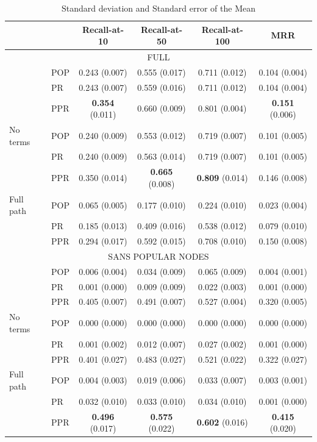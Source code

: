 \documentclass[11pt,oneside]{book}
\begin{document}
\begin{table}[p]
\centering
\caption{Standard deviation and Standard error of the Mean}
\label{tab:full}
\begin{tabular}{llcccc} \hline
	& & Recall-at-10 & Recall-at-50 & Recall-at-100 & MRR	 \\
\hline
\multicolumn{6}{c}{FULL} \\
\hline
& POP & 0.243 (0.007) & 0.555 (0.017) & 0.711 (0.012) & 0.104 (0.004) \\
& PR & 	0.243 (0.007) & 0.559 (0.016) & 0.711 (0.012) & 0.104 (0.004) \\
& PPR	& \textbf{0.354}	(0.011) & 0.660	(0.009) & 0.801 (0.004) & \textbf{0.151}	(0.006) \\
\hline
No terms & POP & 0.240 (0.009) & 0.553 (0.012) & 0.719 (0.007) & 0.101 (0.005) \\
& PR & 0.240 (0.009) & 0.563 (0.014) & 0.719 (0.007) & 0.101 (0.005) \\
& PPR	& 0.350	(0.014) & \textbf{0.665}	(0.008) & \textbf{0.809}	(0.014) & 0.146	(0.008) \\
\hline
Full path & POP & 0.065 (0.005) & 0.177 (0.010) & 0.224 (0.010) & 0.023 (0.004) \\
& PR & 0.185 (0.013) & 0.409 (0.016) & 0.538 (0.012) & 0.079 (0.010) \\
& PPR	& 0.294	(0.017) & 0.592	(0.015) & 0.708	(0.010) & 0.150	(0.008) \\
\hline
\multicolumn{6}{c}{SANS POPULAR NODES} \\
\hline
 & POP & 	0.006 (0.004) & 0.034 (0.009) & 0.065 (0.009) & 0.004 (0.001) \\
 & PR	& 0.001	(0.000) & 0.009	(0.009) & 0.022	(0.003) & 0.001	(0.000) \\
& PPR	& 0.405	(0.007) & 0.491 (0.007) & 0.527	(0.004) & 0.320	(0.005) \\
\hline
No terms & POP & 	0.000 (0.000) & 0.000 (0.000) & 0.000 (0.000) & 0.000 (0.000) \\
& PR & 	0.001 (0.002) & 0.012 (0.007) & 0.027 (0.002) & 0.001 (0.000) \\
& PPR & 	0.401 (0.027) & 0.483 (0.027) & 0.521 (0.022) & 0.322 (0.027) \\
\hline
Full path & POP & 	0.004 (0.003) & 0.019 (0.006) & 0.033 (0.007) & 0.003 (0.001) \\
& PR & 	0.032 (0.010) & 0.033 (0.010) & 0.034 (0.010) & 0.001 (0.000) \\
& PPR	& \textbf{0.496}	(0.017) & \textbf{0.575}	(0.022) & \textbf{0.602}	(0.016) & \textbf{0.415}	(0.020) \\
\hline
\end{tabular}
\end{table}
\end{document}
